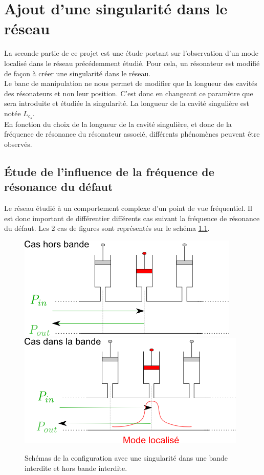 \chapter{Ajout d'une singularité dans le réseau}
La seconde partie de ce projet est une étude portant sur l'observation d'un mode localisé dans le réseau précédemment étudié. Pour cela, un résonateur est modifié de façon à créer une singularité dans le réseau. \\
Le banc de manipulation ne nous permet de modifier que la longueur des cavités des résonateurs et non leur position. C'est donc en changeant ce paramètre que sera introduite et étudiée la singularité. La longueur de la cavité singulière est notée $L_{c_{s}}$.\\

En fonction du choix de la longueur de la cavité singulière, et donc de la fréquence de résonance du résonateur associé, différents phénomènes peuvent être observés. 

\section{Étude de l'influence de la fréquence de résonance du défaut}
Le réseau étudié à un comportement complexe d'un point de vue fréquentiel. Il est donc important de différentier différents cas suivant la fréquence de résonance du défaut. Les 2 cas de figures sont représentés sur le schéma \ref{schema_singu1}.

\begin{figure}[!h]
\centering
\includegraphics[scale=0.5]{images_chp2/schema_singu1.png} \hfill
\includegraphics[scale=0.5]{images_chp2/schema_singu2.png}
\caption{\label{schema_singu1} Schémas de la configuration avec une singularité dans une bande interdite  et hors bande interdite.}
\end{figure}



